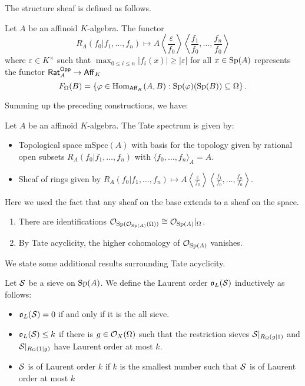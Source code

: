 The structure sheaf is defined as follows. 
\begin{definition}\label{def: structure sheaf of the Tate spectrum}
    Let $A$ be an affinoid $K$-algebra. The functor $$R_{A}(f_{0}|f_{1},\dots,f_{n})\mapsto A\left\langle\frac{\varepsilon}{f_{0}}\right\rangle\left\langle\frac{f_{1}}{f_{0}},\dots,\frac{f_{n}}{f_{0}}\right\rangle$$ where $\varepsilon\in K^{\times}$ such that $\max_{0\leq i\leq n}|f_{i}(x)|\geq|\varepsilon|$ for all $x\in\mathrm{Sp}(A)$ represents the functor $\mathsf{Rat}_{A}^{\mathsf{Opp}}\to\mathsf{Aff}_{K}$
    $$F_{\Omega}(B)=\left\{\varphi\in\mathrm{Hom}_{\mathsf{Aff}_{K}}(A,B):\mathrm{Sp}(\varphi)(\mathrm{Sp}(B))\subseteq\Omega\right\}.$$
\end{definition}
Summing up the preceding constructions, we have:
\begin{definition}\label{def: Tate spectrum as a ringed space}
    Let $A$ be an affinoid $K$-algebra. The Tate spectrum is given by:
    \begin{itemize}
        \item Topological space $\mathrm{mSpec}(A)$ with basis for the topology given by rational open subsets $R_{A}(f_{0}|f_{1},\dots,f_{n})$ with $\langle f_{0},\dots,f_{n}\rangle_{A}=A$. 
        \item Sheaf of rings given by $R_{A}(f_{0}|f_{1},\dots,f_{n})\mapsto A\left\langle\frac{\varepsilon}{f_{0}}\right\rangle\left\langle\frac{f_{1}}{f_{0}},\dots,\frac{f_{n}}{f_{0}}\right\rangle$. 
    \end{itemize}
\end{definition}
Here we used the fact that any sheaf on the base extends to a sheaf on the space. 
\begin{remark}
    \begin{enumerate}[label=(\roman*)]
        \item There are identifications $\mathcal{O}_{\mathrm{Sp}(\mathcal{O}_{\mathrm{Sp}(A)}(\Omega))}\cong\mathcal{O}_{\mathrm{Sp}(A)}|_{\Omega}$. 
        \item By Tate acyclicity, the higher cohomology of $\mathcal{O}_{\mathrm{Sp}(A)}$ vanishes.
    \end{enumerate} 
\end{remark}
We state some additional results surrounding Tate acyclicity. 
\begin{definition}\label{def: Laurent order}
    Let $\mathcal{S}$ be a sieve on $\mathrm{Sp}(A)$. We define the Laurent order $\mathfrak{o}_{L}(\mathcal{S})$ inductively as follows:
    \begin{itemize}
        \item $\mathfrak{o}_{L}(\mathcal{S})=0$ if and only if it is the all sieve. 
        \item $\mathfrak{o}_{L}(\mathcal{S})\leq k$ if there is $g\in\mathcal{O}_{X}(\Omega)$ such that the restriction sieves $\mathcal{S}|_{R_{\Omega}(g|1)}$ and $\mathcal{S}|_{R_{\Omega}(1|g)}$ have Laurent order at most $k$. 
        \item $\mathcal{S}$ is of Laurent order $k$ if $k$ is the smallest number such that $\mathcal{S}$ is of Laurent order at most $k$
    \end{itemize}
\end{definition}

